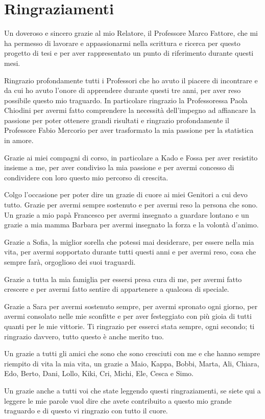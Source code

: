 \chapter*{Ringraziamenti}
\rhead{}

Un doveroso e sincero grazie al mio Relatore, il Professore Marco Fattore, che mi ha permesso di lavorare e appassionarmi nella scrittura e ricerca per questo progetto di tesi e per aver rappresentato un punto di riferimento durante questi mesi.


Ringrazio profondamente tutti i Professori che ho avuto il piacere di incontrare e da cui ho avuto l'onore di apprendere durante questi tre anni, per aver reso possibile questo mio traguardo. In particolare ringrazio la Professoressa Paola Chiodini per avermi fatto comprendere la necessità dell'impegno ad affiancare la passione per poter ottenere grandi risultati e ringrazio profondamente il Professore Fabio Mercorio per aver trasformato la mia passione per la statistica in amore.


Grazie ai miei compagni di corso, in particolare a Kado e Fossa per aver resistito insieme a me, per aver condiviso la mia passione e per avermi concesso di condividere con loro questo mio percorso di crescita.


Colgo l'occasione per poter dire un grazie di cuore ai miei Genitori a cui devo tutto. Grazie per avermi sempre sostenuto e per avermi reso la persona che sono. Un grazie a mio papà Francesco per avermi insegnato a guardare lontano e un grazie a mia mamma Barbara per avermi insegnato la forza e la volontà d'animo.


Grazie a Sofia, la miglior sorella che potessi mai desiderare, per essere nella mia vita, per avermi sopportato durante tutti questi anni
e per avermi reso, cosa che sempre farà, orgoglioso dei suoi traguardi.


Grazie a tutta la mia famiglia per essersi presa cura di me, per avermi fatto crescere e per avermi fatto sentire di appartenere a qualcosa di speciale.


Grazie a Sara per avermi sostenuto sempre, per avermi spronato ogni giorno, per avermi consolato nelle mie sconfitte e per aver festeggiato con più gioia di tutti quanti per le mie vittorie. Ti ringrazio per esserci stata sempre, ogni secondo; ti ringrazio davvero, tutto questo è anche merito tuo.


Un grazie a tutti gli amici che sono che sono cresciuti con me e che hanno sempre riempito di vita la mia vita, un grazie a Maio, Kappa, Bobbi, Marta, Ali, Chiara, Edo, Berto, Dani, Lollo, Kiki, Cri, Michi, Ele, Cesca e Simo.


Un grazie anche a tutti voi che state leggendo questi ringraziamenti, se siete qui a leggere le mie parole vuol dire che avete contribuito a questo mio grande traguardo e di questo vi ringrazio con tutto il cuore.

